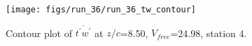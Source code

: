 \begin{figure}[H]
\centering
\texttt{[image: figs/run\_36/run\_36\_tw\_contour]}
\caption{Contour plot of $\overline{t^\prime w^\prime}$ at $z/c$=8.50, $V_{free}$=24.98, station 4.}
\label{fig:run_36_tw_contour}
\end{figure}


